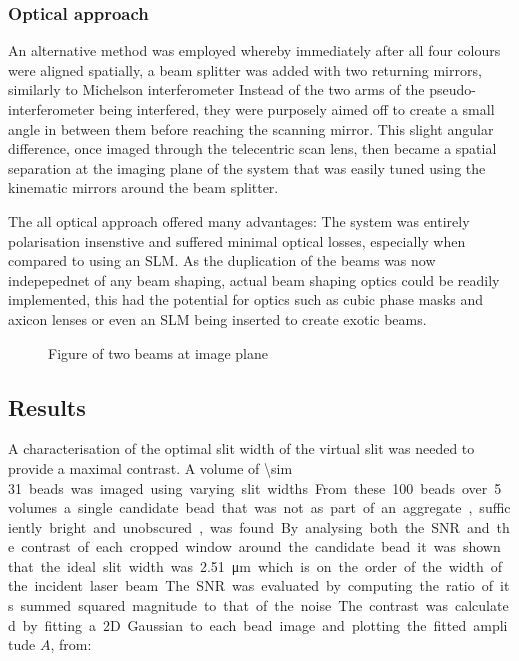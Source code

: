 \subsubsection{Optical approach}
An alternative method was employed whereby immediately after all four colours were aligned spatially, a beam splitter was added with two returning mirrors, similarly to Michelson interferometer
Instead of the two arms of the pseudo-interferometer being interfered, they were purposely aimed off to create a small angle in between them before reaching the scanning mirror.
This slight angular difference, once imaged through the telecentric scan lens, then became a spatial separation at the imaging plane of the system that was easily tuned using the kinematic mirrors around the beam splitter.

The all optical approach offered many advantages: The system was entirely polarisation insenstive and suffered minimal optical losses, especially when compared to using an SLM. As the duplication of the beams was now indepepednet of any beam shaping, actual beam shaping optics could be readily implemented, this had the potential for optics such as cubic phase masks and axicon lenses or even an SLM being inserted to create exotic beams.

\begin{figure}
  \caption{Figure of two beams at image plane}
  \label{}
\end{figure}

\subsection{Results}

A characterisation of the optimal slit width of the virtual slit was needed to provide a maximal contrast.
A volume of \SI{\sim 31} beads was imaged using varying slit widths.
From these 100 beads over 5 volumes a single candidate bead that was not as part of an aggregate, sufficiently bright and unobscured, was found.
By analysing both the SNR and the contrast of each cropped window around the candidate bead it was shown that the ideal slit width was \SI{2.51}{\micro\metre} which is on the order of the width of the incident laser beam.
The SNR was evaluated by computing the ratio of its summed squared magnitude to that of the noise.
The contrast was calculated by fitting a 2D Gaussian to each bead image and plotting the fitted amplitude $A$, from:

